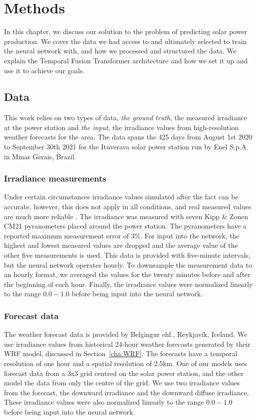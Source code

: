 \chapter{Methods}

In this chapter, we discuss our solution to the problem of predicting solar power production. We cover the data we had access to and ultimately selected to train the neural network with, and how we processed and structured the data. We explain the Temporal Fusion Transformer architecture and how we set it up and use it to achieve our goals.

\section{Data}
This work relies on two types of data, \emph{the ground truth}, the measured irradiance at the power station and \emph{the input}, the irradiance values from high-resolution weather forecasts for the area. The data spans the 425 days from August 1st 2020 to September 30th 2021 for the Ituverava solar power station run by Enel S.p.A. in Minas Gerais, Brazil.

\subsection{Irradiance measurements}
Under certain circumstances irradiance values simulated after the fact can be accurate, however, this does not apply in all conditions, and real measured values are much more reliable \cite{gueymard_global_2008}. The irradiance was measured with seven Kipp \& Zonen CM21 pyranometers placed around the power station. The pyranometers have a reported maximum measurement error of 3\%. For input into the network, the highest and lowest measured values are dropped and the average value of the other five measurements is used. This data is provided with five-minute intervals, but the neural network operates hourly. To downsample the measurement data to an hourly format, we averaged the values for the twenty minutes before and after the beginning of each hour. Finally, the irradiance values were normalized linearly to the range $0.0-1.0$ before being input into the neural network.


\subsection{Forecast data\label{cha:forecast_data}}
The weather forecast data is provided by Belgingur ehf., Reykjavík, Iceland. We use irradiance values from historical 24-hour weather forecasts generated by their WRF model, discussed in Section~\ref{cha:WRF}. The forecasts have a temporal resolution of one hour and a spatial resolution of 2.5km. One of our models uses forecast data from a 3x3 grid centred on the solar power station, and the other model the data from only the centre of the grid. We use two irradiance values from the forecast, the downward irradiance and the downward diffuse irradiance. These irradiance values were also normalized linearly to the range $0.0-1.0$ before being input into the neural network.


